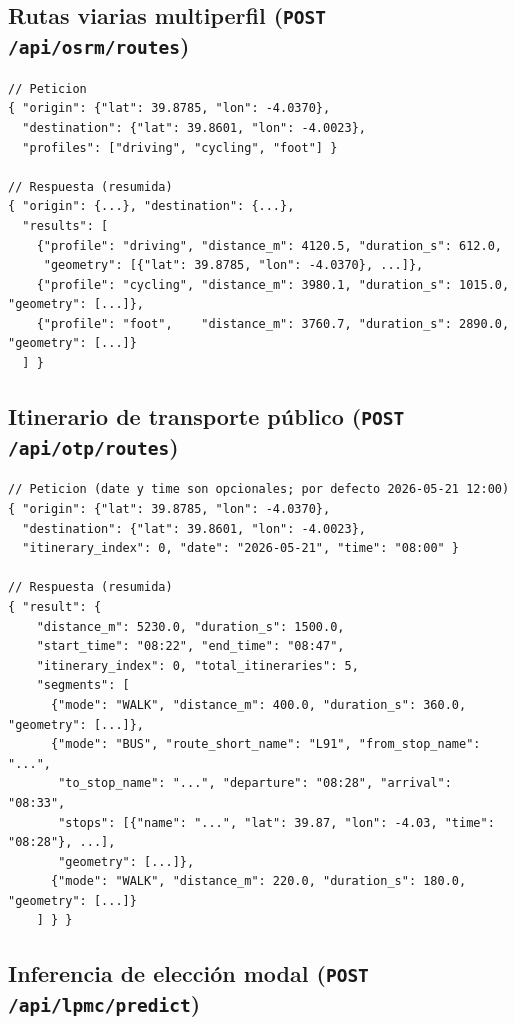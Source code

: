 \subsection{Rutas viarias multiperfil (\texttt{POST /api/osrm/routes})}

\begin{lstlisting}
// Peticion
{ "origin": {"lat": 39.8785, "lon": -4.0370},
  "destination": {"lat": 39.8601, "lon": -4.0023},
  "profiles": ["driving", "cycling", "foot"] }

// Respuesta (resumida)
{ "origin": {...}, "destination": {...},
  "results": [
    {"profile": "driving", "distance_m": 4120.5, "duration_s": 612.0,
     "geometry": [{"lat": 39.8785, "lon": -4.0370}, ...]},
    {"profile": "cycling", "distance_m": 3980.1, "duration_s": 1015.0, "geometry": [...]},
    {"profile": "foot",    "distance_m": 3760.7, "duration_s": 2890.0, "geometry": [...]}
  ] }
\end{lstlisting}

\subsection{Itinerario de transporte público (\texttt{POST /api/otp/routes})}

\begin{lstlisting}
// Peticion (date y time son opcionales; por defecto 2026-05-21 12:00)
{ "origin": {"lat": 39.8785, "lon": -4.0370},
  "destination": {"lat": 39.8601, "lon": -4.0023},
  "itinerary_index": 0, "date": "2026-05-21", "time": "08:00" }

// Respuesta (resumida)
{ "result": {
    "distance_m": 5230.0, "duration_s": 1500.0,
    "start_time": "08:22", "end_time": "08:47",
    "itinerary_index": 0, "total_itineraries": 5,
    "segments": [
      {"mode": "WALK", "distance_m": 400.0, "duration_s": 360.0, "geometry": [...]},
      {"mode": "BUS", "route_short_name": "L91", "from_stop_name": "...",
       "to_stop_name": "...", "departure": "08:28", "arrival": "08:33",
       "stops": [{"name": "...", "lat": 39.87, "lon": -4.03, "time": "08:28"}, ...],
       "geometry": [...]},
      {"mode": "WALK", "distance_m": 220.0, "duration_s": 180.0, "geometry": [...]}
    ] } }
\end{lstlisting}

\subsection{Inferencia de elección modal (\texttt{POST /api/lpmc/predict})}

